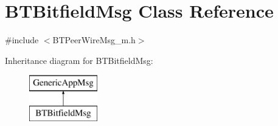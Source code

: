\hypertarget{classBTBitfieldMsg}{}\section{B\+T\+Bitfield\+Msg Class Reference}
\label{classBTBitfieldMsg}


{\ttfamily \#include $<$B\+T\+Peer\+Wire\+Msg\+\_\+m.\+h$>$}

Inheritance diagram for B\+T\+Bitfield\+Msg\+:\begin{figure}[H]
\begin{center}
\leavevmode
\includegraphics[height=2.000000cm]{classBTBitfieldMsg}
\end{center}
\end{figure}
